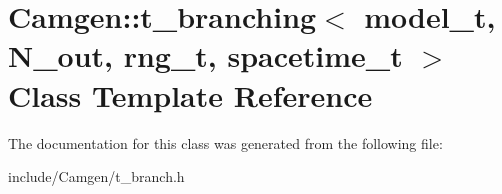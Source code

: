 \hypertarget{a00538}{}\section{Camgen\+:\+:t\+\_\+branching$<$ model\+\_\+t, N\+\_\+out, rng\+\_\+t, spacetime\+\_\+t $>$ Class Template Reference}
\label{a00538}


The documentation for this class was generated from the following file\+:\begin{DoxyCompactItemize}
\item 
include/\+Camgen/t\+\_\+branch.\+h\end{DoxyCompactItemize}
